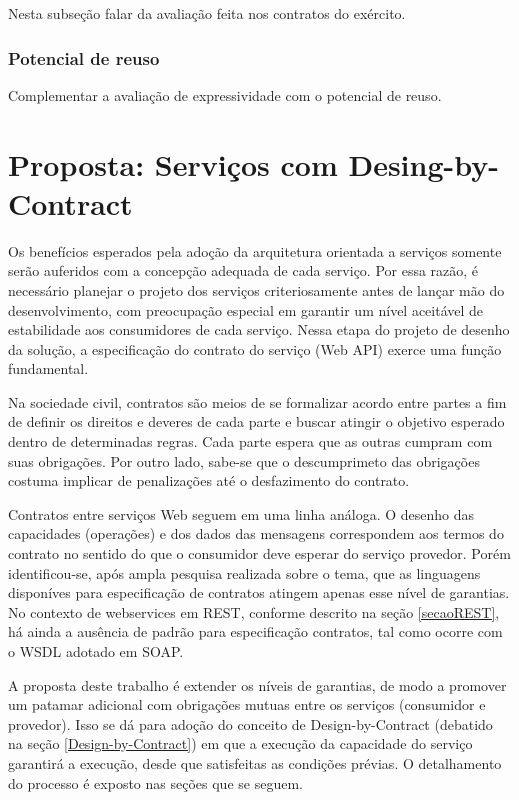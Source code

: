 Nesta subseção falar da avaliação feita nos contratos do exército.

\subsubsection{Potencial de reuso}

Complementar a avaliação de expressividade com o potencial de reuso.

 
\section{Proposta: Serviços com Desing-by-Contract}
\vspace{-6mm}

Os benefícios esperados pela adoção da arquitetura orientada a serviços
somente serão auferidos com a concepção adequada de cada serviço. 
Por essa razão, é necessário planejar o projeto dos serviços criteriosamente
antes de lançar mão do desenvolvimento, com preocupação especial em garantir
um nível aceitável de estabilidade aos consumidores de cada serviço.
Nessa etapa do projeto de desenho da solução, a especificação do contrato do
serviço (Web API) exerce uma função fundamental. 

Na sociedade civil, contratos são meios de se formalizar acordo entre partes a
fim de definir os direitos e deveres de cada parte e buscar atingir o
objetivo esperado dentro de determinadas regras. Cada parte espera que as outras
cumpram com suas obrigações.
Por outro lado, sabe-se que o descumprimeto das obrigações costuma implicar de
penalizações até o desfazimento do contrato. 

Contratos entre serviços Web seguem em uma linha análoga. O desenho das
capacidades (operações) e dos dados das mensagens correspondem aos
termos do contrato no sentido do que o consumidor deve esperar do serviço
provedor. Porém identificou-se, após ampla pesquisa realizada sobre o tema, que
as linguagens disponíves para especificação de contratos atingem apenas esse
nível de garantias. No contexto de webservices em REST, conforme descrito na
seção \ref{secaoREST}, há ainda a ausência de padrão para especificação
contratos, tal como ocorre com o WSDL adotado em SOAP.

A proposta deste trabalho é extender os níveis de garantias, de modo a promover
um patamar adicional com obrigações mutuas entre os serviços (consumidor e
provedor). Isso se dá para adoção do conceito de Design-by-Contract (debatido
na seção \ref{Design-by-Contract}) em que a execução da
capacidade do serviço garantirá a execução, desde que satisfeitas as condições
prévias. O detalhamento do processo é exposto nas seções que se seguem.

